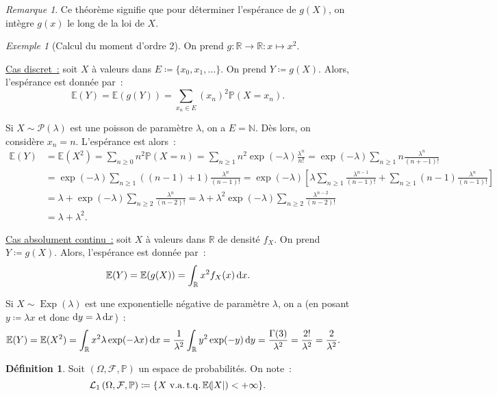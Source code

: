 \documentclass{article}
\newcommand{\E}{\mathbb E}
\newcommand{\N}{\mathbb N}
\renewcommand{\P}{\mathbb P}
\newcommand{\R}{\mathbb R}
\newcommand{\espproba}[3]{\left(#1, #2, #3\right)}
\newcommand{\Ofp}{\espproba \Omega{\mathcal F}\P}
\newcommand{\Lu}{\mathcal L_1\Ofp}
\DeclareMathOperator{\tq}{t.q.}
\DeclareMathOperator{\Exp}{Exp}
\theoremstyle{definition}
\newtheorem{déf}[thm]{Définition}
\theoremstyle{remark}
\newtheorem*{rmq}{Remarque}
\newtheorem{ex}{Exemple}
\begin{document}
		\begin{rmq} Ce théorème signifie que pour déterminer l'espérance de $g(X)$, on intègre $g(x)$ le long de la loi de $X$. \end{rmq}

		\begin{ex}[Calcul du moment d'ordre 2] On prend $g : \R \to \R : x \mapsto x^2$.

		\underline{Cas discret~:} soit $X$ à valeurs dans $E \coloneqq \{x_0, x_1, \ldots\}$. On prend $Y \coloneqq g(X)$. Alors, l'espérance est donnée par~:
		\[\E(Y) = \E(g(Y)) = \sum_{x_n \in E}(x_n)^2\P(X = x_n).\]

		Si $X \sim \mathcal P(\lambda)$ est une poisson de paramètre $\lambda$, on a $E = \N$. Dès lors, on considère $x_n = n$. L'espérance est alors~:
		\begin{align*}
			\E(Y) &= \E(X^2) = \sum_{n \geq 0} n^2\P(X = n) = \sum_{n \geq 1}n^2\exp(-\lambda)\frac {\lambda^n}{n!} = \exp(-\lambda)\sum_{n \geq 1}n\frac {\lambda^n}{(n+-1)!} \\
			      &= \exp(-\lambda)\sum_{n \geq 1}\left((n-1) + 1\right)\frac {\lambda^n}{(n-1)!}
				  = \exp(-\lambda)\left[\lambda\sum_{n \geq 1}\frac {\lambda^{n-1}}{(n-1)!} + \sum_{n \geq 1}(n-1)\frac {\lambda^n}{(n-1)!}\right] \\
				  &= \lambda + \exp(-\lambda)\sum_{n \geq 2}\frac {\lambda^n}{(n-2)!} = \lambda + \lambda^2\exp(-\lambda)\sum_{n \geq 2}\frac {\lambda^{n-2}}{(n-2)!} \\
				  &= \lambda + \lambda^2.
		\end{align*}

		\underline{Cas absolument continu~:} soit $X$ à valeurs dans $\R$ de densité $f_X$. On prend $Y \coloneqq g(X)$. Alors, l'espérance est donnée par~:
		\[\E(Y) = \E(g(X)) = \int_\R x^2f_X(x)\dif x.\]

		Si $X \sim \Exp(\lambda)$ est une exponentielle négative de paramètre $\lambda$, on a (en posant $y \coloneqq \lambda x$ et donc
		$\dif y = \lambda \dif x$)~:
		\begin{align*}
			\E(Y) &= \E(X^2) = \int_\R x^2\lambda\exp(-\lambda x)\dif x = \frac 1{\lambda^2}\int_\R y^2\exp(-y)\dif y = \frac {\Gamma(3)}{\lambda^2}
			      = \frac {2!}{\lambda^2}  = \frac 2{\lambda^2}.
		\end{align*}
		\end{ex}

		\begin{déf} Soit $\Ofp$ un espace de probabilités. On note~:
		\begin{equation}
			\Lu \coloneqq \{X \text{ v.a.} \tq \E(\abs X) < +\infty\}.
		\end{equation}
		\end{déf}
\end{document}
